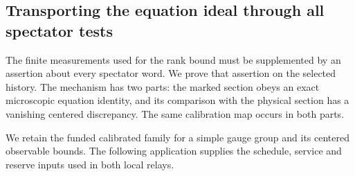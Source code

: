 \subsection{Transporting the equation ideal through all spectator tests}
\label{sec:actual-equation-kernel-relay}

The finite measurements used for the rank bound must be supplemented by
an assertion about every spectator word. We prove that assertion on the
selected history. The mechanism has two parts: the marked section obeys
an exact microscopic equation identity, and its comparison with the
physical section has a vanishing centered discrepancy. The same
calibration map occurs in both parts.

We retain the funded calibrated family for a simple gauge group and its
centered observable bounds. The following application supplies the schedule,
service and reserve inputs used in both local relays.

